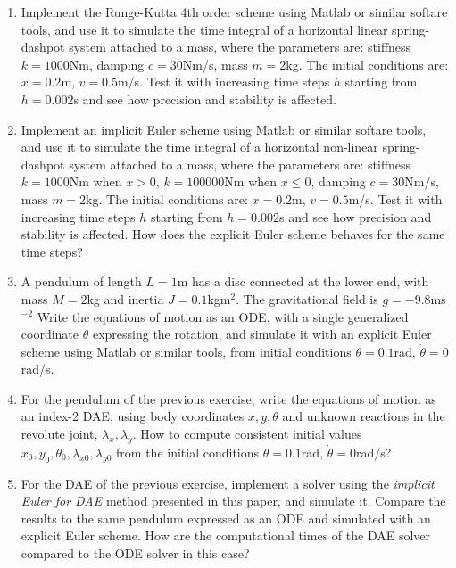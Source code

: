 \documentclass{digitaldynamics}
\begin{document}
{
\small

\begin{enumerate}
	
	\item Implement the Runge-Kutta 4th order scheme using Matlab or similar softare tools, and use it to simulate the time integral of a horizontal linear spring-dashpot system attached to a mass, where the parameters are: stiffness $k=1000$Nm, damping  $c=30$Nm/s, mass $m=2$kg. The initial conditions are: $x=0.2$m, $v=0.5$m/s. Test it with increasing time steps $h$ starting from $h=0.002$s and see how precision and stability is affected. 
	
	\item Implement an implicit Euler scheme using Matlab or similar softare tools, and use it to simulate the time integral of a horizontal non-linear spring-dashpot system attached to a mass, where the parameters are: stiffness $k=1000$Nm when $x>0$, $k=100000$Nm when $x\leq0$, damping  $c=30$Nm/s, mass $m=2$kg. The initial conditions are: $x=0.2$m, $v=0.5$m/s. Test it with increasing time steps $h$ starting from $h=0.002$s and see how precision and stability is affected. How does the explicit Euler scheme behaves for the same time steps?
	
	\item A pendulum of length $L=1$m has a disc connected at the lower end, with mass $M=2$kg and inertia $J=0.1$kgm$^2$. The gravitational field is $g=-9.8$ms$^{-2}$ Write the equations of motion as an ODE, with a single generalized coordinate $\theta$ expressing the rotation, and simulate it with an explicit Euler scheme using Matlab or similar tools, from initial conditions $\theta=0.1$rad, $\dot{\theta}=0$rad/s. 
	
	\item For the pendulum of the previous exercise, write the equations of motion as an index-2 DAE, using body coordinates $x,y,\theta$ and unknown reactions in the revolute joint, $\lambda_x, \lambda_y$. How to compute consistent initial values $x_0,y_0,\theta_0, \lambda_{x0},\lambda_{y0}$ from the initial conditions $\theta=0.1$rad, $\dot{\theta}=0$rad/s?
	
	\item For the DAE of the previous exercise, implement a solver using the \textit{implicit Euler for DAE} method presented in this paper, and simulate it. Compare the results to the same pendulum expressed as an ODE and simulated with an explicit Euler scheme. How are the computational times of the DAE solver compared to the ODE solver in this case?
	
	
\end{enumerate}

}


\printbibliography


%

%

\end{document}
